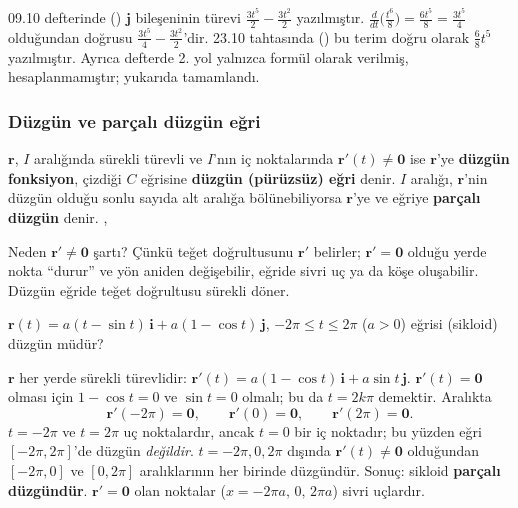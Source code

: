 \begin{dikkat}
09.10 defterinde () $\mathbf j$ bileşeninin türevi $\frac{3t^5}{2}-\frac{3t^2}{2}$ yazılmıştır.
$\frac{d}{dt}\big(\frac{t^6}{8}\big)=\frac{6t^5}{8}=\frac{3t^5}{4}$ olduğundan doğrusu $\frac{3t^5}{4}-\frac{3t^2}{2}$'dir.
23.10 tahtasında () bu terim doğru olarak $\frac68t^5$ yazılmıştır. Ayrıca defterde 2. yol
yalnızca formül olarak verilmiş, hesaplanmamıştır; yukarıda tamamlandı.
\end{dikkat}

\subsubsection{Düzgün ve parçalı düzgün eğri}

\begin{tanim}
$\mathbf r$, $I$ aralığında sürekli türevli ve $I$'nın iç noktalarında $\mathbf r'(t)\neq\mathbf 0$ ise $\mathbf r$'ye
\textbf{düzgün fonksiyon}, çizdiği $C$ eğrisine \textbf{düzgün (pürüzsüz) eğri} denir. $I$ aralığı, $\mathbf r$'nin düzgün olduğu
sonlu sayıda alt aralığa bölünebiliyorsa $\mathbf r$'ye ve eğriye \textbf{parçalı düzgün} denir.
, 
\end{tanim}

Neden $\mathbf r'\neq\mathbf 0$ şartı? Çünkü teğet doğrultusunu $\mathbf r'$ belirler; $\mathbf r'=\mathbf 0$ olduğu yerde nokta
``durur'' ve yön aniden değişebilir, eğride sivri uç ya da köşe oluşabilir. Düzgün eğride teğet doğrultusu sürekli döner.

\begin{soru}
$\mathbf r(t)=a(t-\sin t)\,\mathbf i+a(1-\cos t)\,\mathbf j$, $-2\pi\le t\le2\pi$ ($a>0$) eğrisi (sikloid) düzgün müdür?
\end{soru}
\begin{cevap}
$\mathbf r$ her yerde sürekli türevlidir: $\mathbf r'(t)=a(1-\cos t)\,\mathbf i+a\sin t\,\mathbf j$.
$\mathbf r'(t)=\mathbf 0$ olması için $1-\cos t=0$ ve $\sin t=0$ olmalı; bu da $t=2k\pi$ demektir. Aralıkta
\[ \mathbf r'(-2\pi)=\mathbf 0,\qquad \mathbf r'(0)=\mathbf 0,\qquad \mathbf r'(2\pi)=\mathbf 0 . \]
$t=-2\pi$ ve $t=2\pi$ uç noktalardır, ancak $t=0$ bir iç noktadır; bu yüzden eğri $[-2\pi,2\pi]$'de düzgün \emph{değildir}.
$t=-2\pi,0,2\pi$ dışında $\mathbf r'(t)\neq\mathbf 0$ olduğundan $[-2\pi,0]$ ve $[0,2\pi]$ aralıklarının her birinde düzgündür.
Sonuç: sikloid \textbf{parçalı düzgündür}. $\mathbf r'=\mathbf 0$ olan noktalar ($x=-2\pi a,\,0,\,2\pi a$) sivri uçlardır.
\end{cevap}

